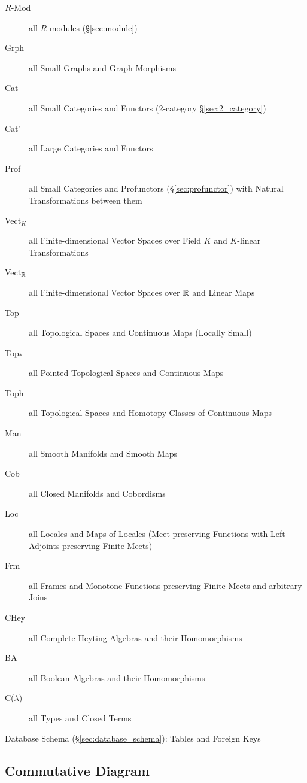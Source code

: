 \begin{description}
\item [$R$-Mod] all $R$-modules (\S\ref{sec:module})
\item [Grph] all Small Graphs and Graph Morphisms
\item [Cat] all Small Categories and Functors (2-category
  \S\ref{sec:2_category})
\item [Cat'] all Large Categories and Functors
\item [Prof] all Small Categories and Profunctors
  (\S\ref{sec:profunctor}) with Natural Transformations between them
\item [Vect$_K$] all Finite-dimensional Vector Spaces over Field $K$
  and $K$-linear Transformations
\item [Vect$_{\mathbb{R}}$] all Finite-dimensional Vector Spaces over
  $\mathbb{R}$ and Linear Maps
\item [Top] all Topological Spaces and Continuous Maps (Locally Small)
\item [Top$_*$] all Pointed Topological Spaces and Continuous Maps
\item [Toph] all Topological Spaces and Homotopy Classes of Continuous
  Maps
\item [Man] all Smooth Manifolds and Smooth Maps
\item [Cob] all Closed Manifolds and Cobordisms
\item [Loc] all Locales and Maps of Locales (Meet preserving Functions
  with Left Adjoints preserving Finite Meets)
\item [Frm] all Frames and Monotone Functions preserving Finite Meets
  and arbitrary Joins
\item [CHey] all Complete Heyting Algebras and their Homomorphisms
\item [BA] all Boolean Algebras and their Homomorphisms
\item [C($\lambda$)] all Types and Closed Terms
\end{description}

Database Schema (\S\ref{sec:database_schema}): Tables and Foreign Keys



\subsection{Commutative Diagram}\label{sec:commutative_diagram}

